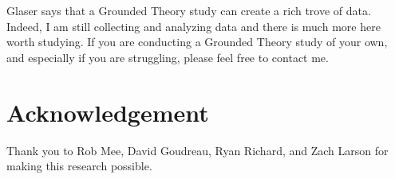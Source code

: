 Glaser says that a Grounded Theory study can create a rich trove of data. Indeed, I am still collecting and analyzing data and there is much more here worth studying. If you are conducting a Grounded Theory study of your own, and especially if you are struggling, please feel free to contact me.

\section*{Acknowledgement}
Thank you to Rob Mee, David Goudreau, Ryan Richard, and Zach Larson for making this research possible.





